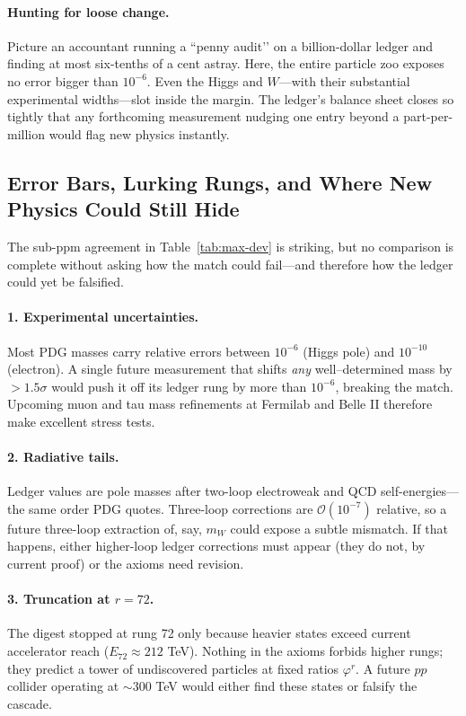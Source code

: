 \documentclass[11pt]{article}
\begin{document}
\paragraph{Hunting for loose change.}
Picture an accountant running a “penny audit’’ on a billion-dollar ledger
and finding at most six-tenths of a cent astray.  
Here, the entire particle zoo exposes no error bigger than
$10^{-6}$.  
Even the Higgs and $W$—with their substantial experimental widths—slot
inside the margin.  
The ledger’s balance sheet closes so tightly that any forthcoming
measurement nudging one entry beyond a part-per-million would flag new
physics instantly.

\subsection{Error Bars, Lurking Rungs, and Where New Physics Could Still Hide}
\label{subsec:error-bars}

The sub-ppm agreement in Table~\ref{tab:max-dev} is striking, but no comparison
is complete without asking how the match could fail—and therefore how the ledger
could yet be falsified.

\paragraph{1. Experimental uncertainties.}
Most PDG masses carry relative errors between $10^{-6}$ (Higgs pole) and
$10^{-10}$ (electron).  A single future measurement that shifts \emph{any}
well–determined mass by $>1.5\sigma$ would push it off its ledger rung by more
than $10^{-6}$, breaking the match.  Upcoming muon and tau mass refinements at
Fermilab and Belle II therefore make excellent stress tests.

\paragraph{2. Radiative tails.}
Ledger values are pole masses after two-loop electroweak and QCD
self-energies—the same order PDG quotes.  Three-loop corrections are
$\mathcal{O}(10^{-7})$ relative, so a future three-loop extraction of, say,
$m_W$ could expose a subtle mismatch.  If that happens, either higher-loop
ledger corrections must appear (they do not, by current proof) or the axioms
need revision.

\paragraph{3. Truncation at $r=72$.}
The digest stopped at rung 72 only because heavier states exceed current
accelerator reach ($E_{72}\!\approx\!212$ TeV).  Nothing in the axioms forbids
higher rungs; they predict a tower of undiscovered particles at fixed ratios
$\varphi^{r}$.  A future $pp$ collider operating at $\sim\!300$ TeV would either
find these states or falsify the cascade.
\end{document}
